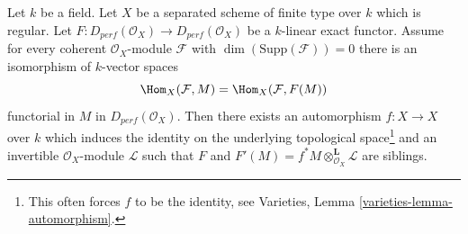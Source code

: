 %
\begin{lemma}
\label{lemma-preserves-Coh}
Let $k$ be a field. Let $X$ be a separated scheme of finite type over $k$ which
is regular. Let $F : D_{perf}(\mathcal{O}_X) \to D_{perf}(\mathcal{O}_X)$
be a $k$-linear exact functor. Assume for every coherent
$\mathcal{O}_X$-module $\mathcal{F}$ with $\dim(\text{Supp}(\mathcal{F})) = 0$
there is an isomorphism of $k$-vector spaces
$$
\Hom_X(\mathcal{F}, M) = \Hom_X(\mathcal{F}, F(M))
$$
functorial in $M$ in $D_{perf}(\mathcal{O}_X)$. Then there exists an
automorphism $f : X \to X$ over $k$ which induces the identity on the
underlying topological space\footnote{This often forces $f$
to be the identity, see Varieties, Lemma \ref{varieties-lemma-automorphism}.}
and an invertible $\mathcal{O}_X$-module $\mathcal{L}$
such that $F$ and $F'(M) = f^*M \otimes_{\mathcal{O}_X}^\mathbf{L} \mathcal{L}$
are siblings.
\end{lemma}

